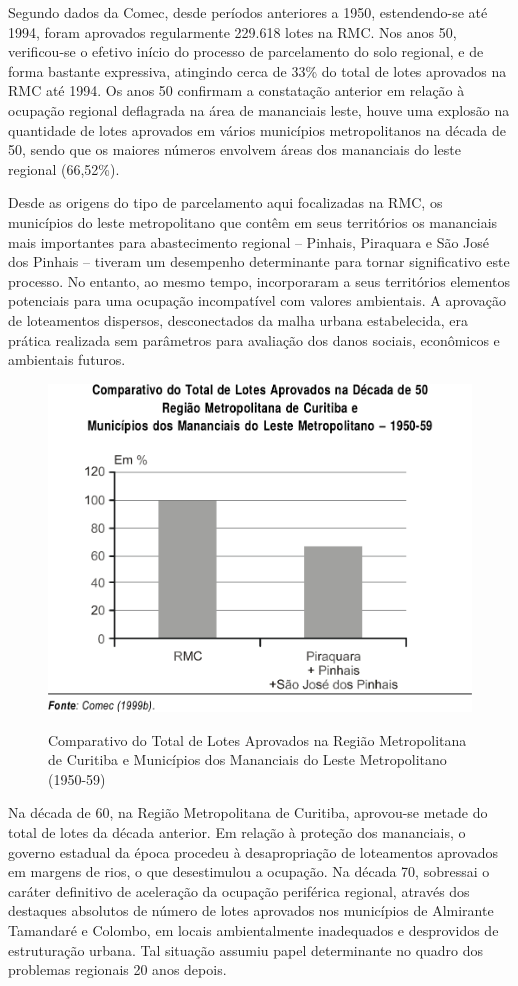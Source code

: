 	Segundo dados da Comec, desde períodos anteriores a 1950, estendendo-se até 1994, foram aprovados regularmente 229.618 lotes na RMC. Nos anos 50, verificou-se o efetivo início do processo de parcelamento do solo regional, e de forma bastante expressiva, atingindo cerca de 33\% do total de lotes aprovados na RMC até 1994. Os anos 50 confirmam a constatação anterior em relação à ocupação regional deflagrada na área de mananciais leste,  houve uma explosão na quantidade de lotes aprovados em vários municípios metropolitanos na década de 50, sendo que os maiores números envolvem áreas dos mananciais do leste regional (66,52\%).
	
	Desde as origens do tipo de parcelamento aqui focalizadas na RMC, os municípios do leste metropolitano que contêm em seus territórios os mananciais mais importantes para abastecimento regional – Pinhais, Piraquara e São José dos Pinhais – tiveram um desempenho determinante para tornar significativo este processo. No entanto, ao mesmo tempo, incorporaram a seus territórios elementos potenciais para uma ocupação incompatível com valores ambientais. A aprovação de loteamentos dispersos, desconectados da malha urbana estabelecida, era prática realizada sem parâmetros para avaliação dos danos sociais, econômicos e ambientais futuros.
	
	\begin{figure}
		\centering
		\caption{Comparativo do Total de Lotes Aprovados na Região Metropolitana de Curitiba e Municípios dos Mananciais do Leste Metropolitano (1950-59)}
		\includegraphics[width=0.6\linewidth]{img/lima2001a_01}
		\label{fig:lima2001a_01}
	\end{figure}

	Na década de 60, na Região Metropolitana de Curitiba, aprovou-se metade do total de lotes da década anterior. Em relação à proteção dos mananciais, o governo estadual da época procedeu à desapropriação de loteamentos aprovados em margens de rios, o que desestimulou a ocupação. Na década 70, sobressai o caráter definitivo de aceleração da ocupação periférica regional, através dos destaques absolutos de número de lotes aprovados nos municípios de Almirante Tamandaré e Colombo, em locais ambientalmente inadequados e desprovidos de estruturação urbana. Tal situação assumiu papel determinante no quadro dos problemas regionais 20 anos depois.
	
